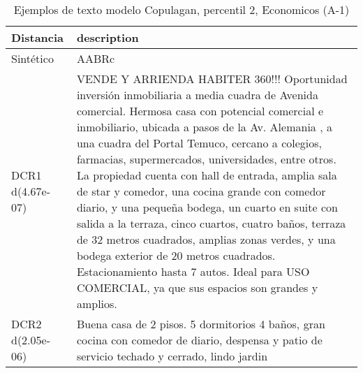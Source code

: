 \begin{table}[H]
\centering
\fontsize{10}{14}\selectfont
\caption{Ejemplos de texto modelo Copulagan, percentil 2, Economicos (A-1)}
\label{table-example-economicos-a-1-copulagan-2p-text}
\begin{tabular}{|l|m{35em}|}
\hline
\rowcolor[gray]{0.8}
Distancia & description \\
\hline Sintético & AABRc \\
\hline DCR1 d(4.67e-07) & VENDE Y ARRIENDA HABITER 360!!!  Oportunidad inversi\'on inmobiliaria a media cuadra de Avenida comercial.  Hermosa casa con potencial comercial e inmobiliario, ubicada a pasos de la Av. Alemania , a una cuadra del Portal Temuco, cercano a colegios, farmacias, supermercados, universidades, entre otros.  La propiedad cuenta con hall de entrada, amplia sala de star y comedor, una cocina grande con comedor diario, y una peque\~na bodega, un cuarto en suite con salida a la terraza, cinco cuartos, cuatro ba\~nos, terraza de 32 metros cuadrados, amplias zonas verdes, y una bodega exterior de 20 metros cuadrados.  Estacionamiento hasta 7 autos.  Ideal para USO COMERCIAL, ya que sus espacios son grandes y amplios. \\
\hline DCR2 d(2.05e-06) & Buena casa de 2 pisos. 5 dormitorios 4 ba\~nos, gran cocina con comedor de diario, despensa y patio de servicio techado y cerrado, lindo jardin \\
\hline
\end{tabular}
\end{table}
